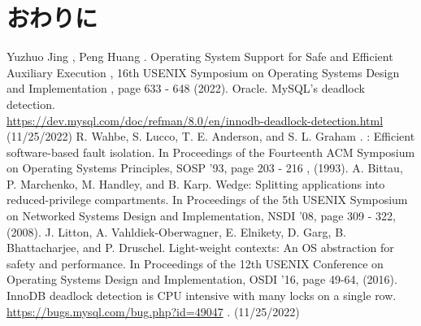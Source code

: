 \documentclass[submit,techreq,noauthor]{eco}	%
\begin{document}
\section{おわりに}


\begin{thebibliography}{99}
   Yuzhuo Jing , Peng Huang . Operating System 
  Support for Safe and Efficient Auxiliary Execution , 16th 
  USENIX Symposium on Operating Systems Design and Implementation ,
   page 633 - 648 (2022).
   Oracle. MySQL's deadlock detection.\\
  \url{https://dev.mysql.com/doc/refman/8.0/en/innodb-deadlock-detection.html}
  (11/25/2022)
   R. Wahbe, S. Lucco, T. E. Anderson, and S. L. Graham .
  : Efficient software-based fault isolation. In Proceedings of the 
  Fourteenth ACM Symposium on Operating Systems Principles, SOSP '93,
   page 203 - 216 , (1993).
  A. Bittau, P. Marchenko, M. Handley, and B. Karp. 
  Wedge: Splitting applications into reduced-privilege compartments.
   In Proceedings of the 5th USENIX Symposium on Networked Systems 
   Design and Implementation, NSDI '08, page 309 - 322, (2008).
  J. Litton, A. Vahldiek-Oberwagner, E. Elnikety, D. 
  Garg, B. Bhattacharjee, and P. Druschel. Light-weight contexts: 
  An OS abstraction for safety and performance. In Proceedings of
  the 12th USENIX Conference on Operating Systems Design and Implementation,
   OSDI '16, page 49-64, (2016).
  InnoDB deadlock detection is CPU intensive with many locks on a single row.
    \url{https://bugs.mysql.com/bug.php?id=49047} . (11/25/2022)
\end{thebibliography}
\end{document}
